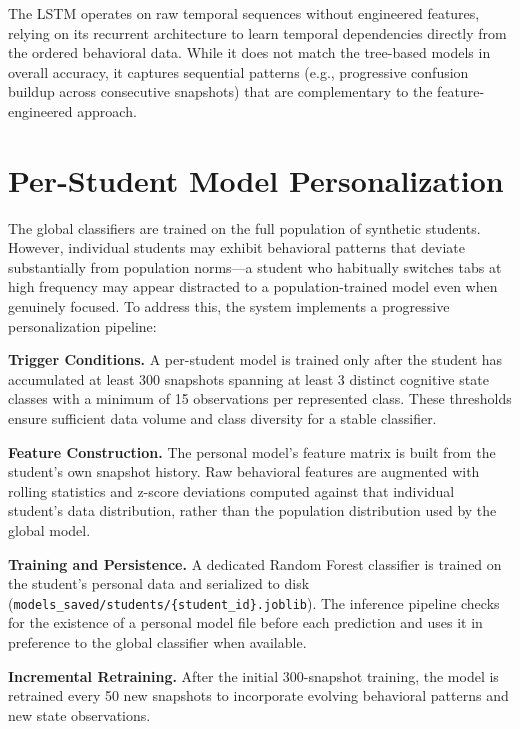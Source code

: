 \documentclass[conference]{IEEEtran}
\begin{document}
The LSTM operates on raw temporal sequences without engineered features, relying on its recurrent architecture to learn temporal dependencies directly from the ordered behavioral data. While it does not match the tree-based models in overall accuracy, it captures sequential patterns (e.g., progressive confusion buildup across consecutive snapshots) that are complementary to the feature-engineered approach.

\section{Per-Student Model Personalization}

The global classifiers are trained on the full population of synthetic students. However, individual students may exhibit behavioral patterns that deviate substantially from population norms---a student who habitually switches tabs at high frequency may appear distracted to a population-trained model even when genuinely focused. To address this, the system implements a progressive personalization pipeline:

\textbf{Trigger Conditions.} A per-student model is trained only after the student has accumulated at least 300 snapshots spanning at least 3 distinct cognitive state classes with a minimum of 15 observations per represented class. These thresholds ensure sufficient data volume and class diversity for a stable classifier.

\textbf{Feature Construction.} The personal model's feature matrix is built from the student's own snapshot history. Raw behavioral features are augmented with rolling statistics and z-score deviations computed against that individual student's data distribution, rather than the population distribution used by the global model.

\textbf{Training and Persistence.} A dedicated Random Forest classifier is trained on the student's personal data and serialized to disk (\texttt{models\_saved/students/\{student\_id\}.joblib}). The inference pipeline checks for the existence of a personal model file before each prediction and uses it in preference to the global classifier when available.

\textbf{Incremental Retraining.} After the initial 300-snapshot training, the model is retrained every 50 new snapshots to incorporate evolving behavioral patterns and new state observations.
\end{document}
